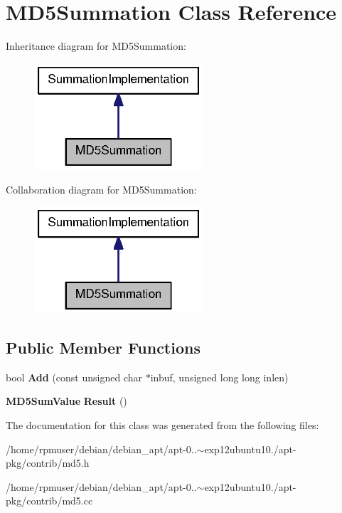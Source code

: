 \section{\-M\-D5\-Summation \-Class \-Reference}
\label{classMD5Summation}


\-Inheritance diagram for \-M\-D5\-Summation\-:
\nopagebreak
\begin{figure}[H]
\begin{center}
\leavevmode
\includegraphics[width=178pt]{classMD5Summation__inherit__graph}
\end{center}
\end{figure}


\-Collaboration diagram for \-M\-D5\-Summation\-:
\nopagebreak
\begin{figure}[H]
\begin{center}
\leavevmode
\includegraphics[width=178pt]{classMD5Summation__coll__graph}
\end{center}
\end{figure}
\subsection*{\-Public \-Member \-Functions}
\begin{DoxyCompactItemize}
\item 
bool {\bfseries \-Add} (const unsigned char $\ast$inbuf, unsigned long long inlen)\label{classMD5Summation_a40d3316c4ec4117ba34228572ea32a65}

\item 
{\bf \-M\-D5\-Sum\-Value} {\bfseries \-Result} ()\label{classMD5Summation_acca152a603e47289752a3e0dd46747f4}

\end{DoxyCompactItemize}


\-The documentation for this class was generated from the following files\-:\begin{DoxyCompactItemize}
\item 
/home/rpmuser/debian/debian\-\_\-apt/apt-\/0..$\sim$exp12ubuntu10./apt-\/pkg/contrib/md5.\-h\item 
/home/rpmuser/debian/debian\-\_\-apt/apt-\/0..$\sim$exp12ubuntu10./apt-\/pkg/contrib/md5.\-cc\end{DoxyCompactItemize}
